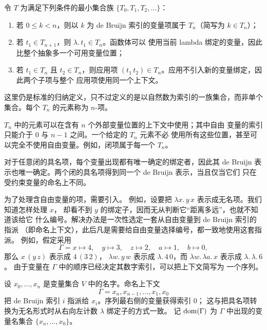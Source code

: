 \begin{definition}[项]
\label{def:6.1.2}
令 \(T\) 为满足下列条件的最小集合族
\(\{T_0,T_1,T_2,\ldots\}\)：
\begin{enumerate}
  \item 若 \(0\leq k<n\)，则以 \(k\) 为 de Bruijn 索引的变量项属于
    \(T_n\)（简写为 \(k\in T_n\)）；
  \item 若 \(t_1\in T_{n+1}\)，则 \(\lambda.\,t_1\in T_n\)。函数体可以
    使用当前 lambda 绑定的变量，因此比整个抽象多一个可用变量位置；
  \item 若 \(t_1\in T_n\) 且 \(t_2\in T_n\)，则应用项
    \((t_1\,t_2)\in T_n\)。应用不引入新的变量绑定，因此两个子项与整个
    应用项使用同一个上下文。
\end{enumerate}
这里仍是标准的归纳定义，只不过定义的是以自然数为索引的一族集合，而非单个
集合。每个 \(T_n\) 的元素称为 \(n\)-项。
\end{definition}

\(T_n\) 中的元素可以在含有 \(n\) 个外部变量位置的上下文中使用；其中自由
变量的索引只能介于 \(0\) 与 \(n-1\) 之间。一个给定的 \(T_n\) 元素不必
使用所有这些位置，甚至可以完全不使用自由变量。例如，闭项属于每一个
\(T_n\)。

对于任意闭的具名项，每个变量出现都有唯一确定的绑定者，因此其 de Bruijn
表示也唯一确定。两个闭的具名项得到同一个 de Bruijn 表示，当且仅当它们
只在受约束变量的命名上不同。

为了处理含自由变量的项，需要引入。
例如，设要把 \(\lambda x.\,y\,x\) 表示成无名项。我们知道怎样处理 \(x\)，
却看不到 \(y\) 的绑定子，因而无从判断它“距离多远”，也就不知道该给它
什么编号。解决办法是一次性选定一套从自由变量到 de Bruijn 索引的指派
（即命名上下文），此后凡是需要给自由变量选择编号，都一致地使用这套指派。
例如，假定采用
\[
 \Gamma=x\mapsto4,\quad y\mapsto3,\quad z\mapsto2,\quad
 a\mapsto1,\quad b\mapsto0,
\]
那么 \(x\,(y\,z)\) 表示成 \(4\,(3\,2)\)，
\(\lambda w.\,y\,w\) 表示成 \(\lambda.\,4\,0\)，而
\(\lambda w.\,\lambda a.\,x\) 表示成 \(\lambda.\,\lambda.\,6\)。
由于变量在 \(\Gamma\) 中的顺序已经决定其数字索引，可以把上下文简写为
一个序列。

\begin{definition}
\label{def:6.1.3}
设 \(x_0,\ldots,x_n\) 是变量集合 \(V\) 中的名字。命名上下文
\[
 \Gamma=x_n,x_{n-1},\ldots,x_1,x_0
\]
把 de Bruijn 索引 \(i\) 指派给 \(x_i\)。序列最右侧的变量获得索引 \(0\)；
这与把具名项转换为无名形式时从右向左计数 \(\lambda\) 绑定子的方式一致。
记 \(\operatorname{dom}(\Gamma)\) 为 \(\Gamma\) 中出现的变量名集合
\(\{x_n,\ldots,x_0\}\)。
\end{definition}

